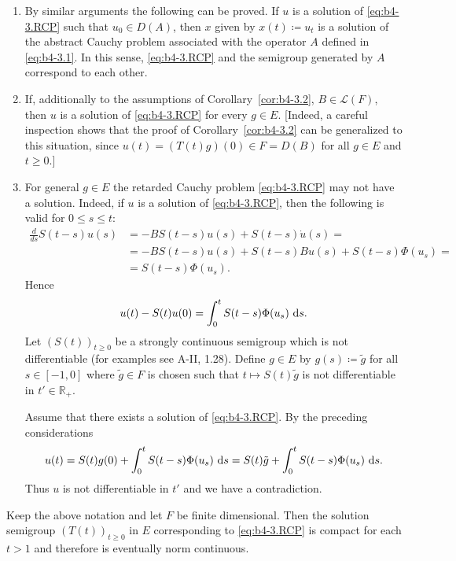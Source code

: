 \begin{remarks*} 
\begin{enumerate}[\upshape (i), wide, labelindent=.5em]

\item 
By similar arguments the following can be proved. If $u$ is a solution of \eqref{eq:b4-3.RCP} such that $u_{0} \in D(A)$, then $x$ given by $x(t) \coloneq  u_t$ is a solution of the abstract Cauchy problem associated with the operator $A$ defined in \eqref{eq:b4-3.1}. 
In this sense, \eqref{eq:b4-3.RCP} and the semigroup generated by $A$ correspond to each other.

\item 
If, additionally to the assumptions of Corollary~\ref{cor:b4-3.2}, $B \in \mathcal{L}(F)$, then $u$ is a solution of \eqref{eq:b4-3.RCP} for every $g \in E$. 
[Indeed, a careful inspection shows that the proof of Corollary~\ref{cor:b4-3.2} can be generalized to this situation, since $u(t) = (T(t)g)(0) \in F = D(B)$ for all $g \in E$ and $t \geq 0$.]

\item 
For general $g \in E$ the retarded Cauchy problem \eqref{eq:b4-3.RCP} may not have a solution. 
Indeed, if $u$ is a solution of \eqref{eq:b4-3.RCP}, then the following is valid for $0 \leq s \leq t$:
\begin{equation*}
	\begin{aligned}
\frac{d}{ds}S(t-s)u(s) &= -BS(t-s)u(s) + S(t-s)\dot{u}(s) =\\
& = -BS(t-s)u(s) + S(t-s)Bu(s) + S(t-s)\Phi(u_s) = \\ & =S(t-s)\Phi(u_s) .
\end{aligned}
\end{equation*} 
Hence
\[
u(t) - S(t)u(0) = \int_0^t S(t-s)\Phi(u_s) \,\mathop{}\!\mathrm{d}{s}.
\]
Let $(S(t))_{t \geq 0}$ be a strongly continuous semigroup which is not differentiable (for examples see A-II,  1.28). 
Define $g \in E$ by $g(s)  \coloneq  \tilde{g}$ for all $s \in [-1,0]$ where $\tilde{g} \in F$ is chosen such that
$t \mapsto S(t)\tilde{g}$ is not differentiable in $t' \in \mathbb{R}_+$.

Assume that there exists a solution of \eqref{eq:b4-3.RCP}. 
By the preceding considerations
\[
u(t) = S(t)g(0) + \int_0^t S(t-s)\Phi(u_s) \,\mathop{}\!\mathrm{d}{s} = S(t)\tilde{g} + \int_0^t S(t-s)\Phi(u_s) \,\mathop{}\!\mathrm{d}{s} .
\]
Thus $u$ is not differentiable in $t'$ and we have a contradiction.
\end{enumerate}
\end{remarks*}
\begin{corollary}\label{cor:b4-3.3}
%
%
	Keep the above notation and let $F$ be finite dimensional. 
    Then the solution semigroup $(T(t))_{t \geq 0}$ in $E$ corresponding to \eqref{eq:b4-3.RCP} is compact for each $t > 1$ and therefore is eventually norm continuous.
\end{corollary}

